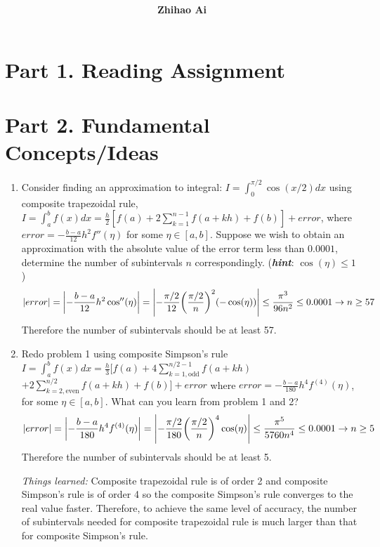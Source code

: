 \documentclass[10pt]{report}
\title{
	\vspace{2in}
	\textmd{\textbf{\hwCourse\\\hwTitle}}\\
	\vspace{0.3in}\large{\textit{\hmwkClassInstructor}}
	\vspace{3in}
}
\author{\textbf{Zhihao Ai}}
\date{}
\newcommand{\dintt}[4] {\int_{#1}^{#2} #3 d#4}
\DeclarePairedDelimiter\autoparen{(}{)}
\newcommand{\pa}[1]{\autoparen*{#1}}
\newcommand{\abs}[1] {\left| #1 \right|}
\begin{document}
\maketitle

\section*{Part 1. Reading Assignment}

\section*{Part 2. Fundamental Concepts/Ideas}
\begin{enumerate}
	\item 
	Consider finding an approximation to integral: $I = \dintt{0}{\pi/2}{\cos(x/2)}{x}$ using composite trapezoidal rule, $I = \dintt{a}{b}{f(x)}{x} = \frac{h}{2}[f(a) + 2\sum_{k=1}^{n-1}f(a+kh) + f(b) ] + error$, where $error = -\frac{b-a}{12}h^2 f''(\eta)$ for some $\eta\in [a,b]$. Suppose we wish to obtain an approximation with the absolute value of the error term less than $0.0001$, determine the number of subintervals $n$ correspondingly. (\textit{\textbf{hint}}: $\cos(\eta) \le 1$)
	\begin{align*}
		\abs{error} = \abs{-\frac{b-a}{12}h^2 \cos''(\eta)}
		= \abs{-\frac{\pi/2}{12} \pa{\frac{\pi/2}{n}}^2 \pa{-\cos(\eta)}}
		\le \frac{\pi^3}{96n^2}
		\le 0.0001
		\to
		n \ge 57
	\end{align*}
	Therefore the number of subintervals should be at least 57.
	
	\item 
	Redo problem 1 using composite Simpson’s rule $I = \dintt{a}{b}{f(x)}{x} = \frac{h}{3}[f(a) + 4\sum_{k=1, \text{odd}}^{n/2-1}f(a+kh) $
	$ + 2\sum_{k=2, \text{even}}^{n/2}f(a+kh) + f(b) ] + error$ where $error = -\frac{b-a}{180}h^4f^{(4)}(\eta)$, for some $\eta\in [a,b]$. What can you learn from problem 1 and 2?
	\begin{align*}
	\abs{error} = \abs{-\frac{b-a}{180}h^4f^{(4)}(\eta)}
	= \abs{-\frac{\pi/2}{180} \pa{\frac{\pi/2}{n}}^4 \cos(\eta)}
	\le \frac{\pi^5}{5760n^4}
	\le 0.0001
	\to
	n \ge 5
	\end{align*}
	Therefore the number of subintervals should be at least 5.
	
	\textit{Things learned:} Composite trapezoidal rule is of order 2 and composite Simpson's rule is of order 4 so the composite Simpson's rule converges to the real value faster. Therefore, to achieve the same level of accuracy, the number of subintervals needed for composite trapezoidal rule is much larger than that for composite Simpson's rule.
	

\end{enumerate}
\end{document}
